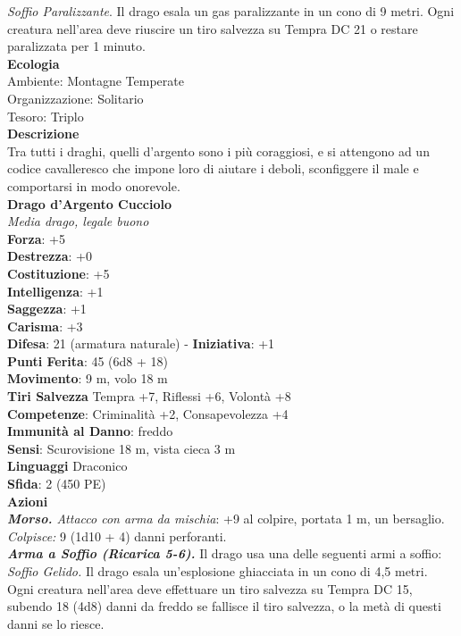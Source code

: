 \begin{multicols}{2}
\emph{Soffio Paralizzante}. Il drago esala un gas paralizzante in un cono di 9 metri. Ogni creatura nell'area deve riuscire un tiro salvezza su Tempra DC  21 o restare paralizzata per 1 minuto.\\
\textbf{Ecologia}\\
Ambiente: Montagne Temperate\\
Organizzazione: Solitario\\
Tesoro: Triplo\\
\textbf{Descrizione}\\
Tra tutti i draghi, quelli d'argento sono i più coraggiosi, e si attengono ad un codice cavalleresco che impone loro di aiutare i deboli, sconfiggere il male e comportarsi in modo onorevole.\\
\medskip\textbf{Drago d'Argento Cucciolo}\\
\emph{Media drago, legale buono}\\
\textbf{Forza}: +5\\
\textbf{Destrezza}: +0\\
\textbf{Costituzione}: +5\\
\textbf{Intelligenza}: +1\\
\textbf{Saggezza}: +1\\
\textbf{Carisma}: +3\\
\textbf{Difesa}: 21 (armatura naturale) - \textbf{Iniziativa}: +1\\
\textbf{Punti Ferita}: 45 (6d8 + 18)\\
\textbf{Movimento}: 9 m, volo 18 m\\
\textbf{Tiri Salvezza} Tempra +7, Riflessi +6, Volontà +8\\
\textbf{Competenze}: Criminalità +2, Consapevolezza +4\\
\textbf{Immunità al Danno}: freddo\\
\textbf{Sensi}: Scurovisione 18 m, vista cieca 3 m\\
\textbf{Linguaggi} Draconico\\
\textbf{Sfida}: 2 (450 PE)\smallskip\\
\smallskip\textbf{Azioni}\\
\emph{\textbf{Morso.} Attacco con arma da mischia}: +9 al colpire, portata 1 m, un bersaglio.\\
\emph{Colpisce:} 9 (1d10 + 4) danni perforanti.\\
\emph{\textbf{Arma a Soffio (Ricarica 5-6).}} Il drago usa una delle seguenti armi a soffio:\\
\emph{Soffio Gelido.} Il drago esala un'esplosione ghiacciata in un cono di 4,5 metri. Ogni creatura nell'area deve effettuare un tiro salvezza su Tempra DC  15, subendo 18 (4d8) danni da freddo se fallisce il tiro salvezza, o la metà di questi danni se lo riesce.\\

\end{multicols}
